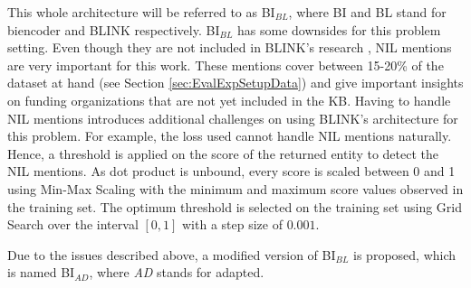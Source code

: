 \documentclass{report}
\theoremstyle{definition}
\theoremstyle{remark}
\begin{document}
This whole architecture will be referred to as BI$_{BL}$, where BI and BL stand for biencoder and BLINK respectively. BI$_{BL}$ has some downsides for this problem setting. Even though they are not included in BLINK's research \cite{scalablezeroshot}, NIL mentions are very important for this work. These mentions cover between 15-20\% of the dataset at hand (see Section \ref{sec:EvalExpSetupData}) and give important insights on funding organizations that are not yet included in the KB. Having to handle NIL mentions introduces additional challenges on using BLINK's architecture for this problem. For example, the loss used cannot handle NIL mentions naturally. Hence, a threshold is applied on the score of the returned entity to detect the NIL mentions. As dot product is unbound, every score is scaled between 0 and 1 using Min-Max Scaling with the minimum and maximum score values observed in the training set. The optimum threshold is selected on the training set using Grid Search over the interval $[0,1]$ with a step size of $0.001$.


Due to the issues described above, a modified version of BI$_{BL}$ is proposed, which is named BI$_{AD}$, where \textit{AD} stands for adapted.
\end{document}

